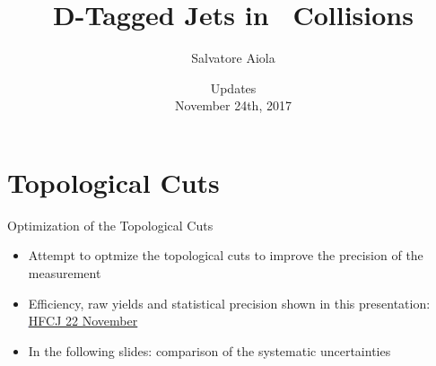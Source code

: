 \documentclass[xcolor={usenames,dvipsnames}]{beamer}
\title[D-Tagged Jets in \pp] %
{D-Tagged Jets in \pp\ Collisions}
\author[Salvatore Aiola]%
{Salvatore Aiola}
\institute[Yale University] %
{Yale University}
\date[Updates - Nov. 24th, 2017] %
{Updates \\
November 24th, 2017}
\begin{document}
\begin{frame}
  \titlepage
\end{frame}








\section{Topological Cuts}

\begin{frame}{Optimization of the Topological Cuts}
\begin{itemize}
\item Attempt to optmize the topological cuts to improve the precision of the measurement
\item Efficiency, raw yields and statistical precision shown in this presentation: \textcolor{blue}{\underline{\href{https://indico.cern.ch/event/670521/contributions/2800244/attachments/1563677/2463018/DtaggedJets_SAiola.pdf}{HFCJ 22 November}}}
\item In the following slides: comparison of the systematic uncertainties
\end{itemize}
\end{frame}
\end{document}
